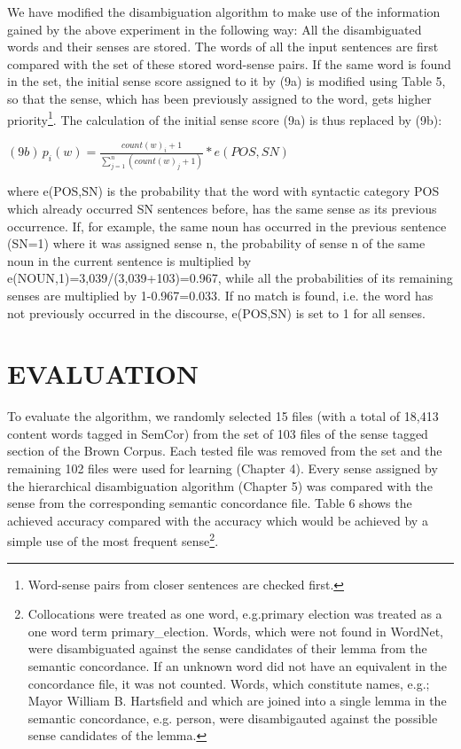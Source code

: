 We have modified the disambiguation algorithm to make use of the information gained by the above experiment in the following way: All the disambiguated words and their senses are stored. The words of all the input sentences are first compared with the set of these stored word-sense pairs. If the same word is found in the set, the initial sense score assigned to it by (9a) is modified using Table 5, so that the sense, which has been previously assigned to the word, gets higher priority\footnote{
Word-sense pairs from closer sentences are checked first.
}. The calculation of the initial sense score (9a) is thus replaced by (9b):
\begin{center}
$(9b) \, \displaystyle p_{i}(w) = \frac{\displaystyle count(w)_{i}+1}{\displaystyle \sum_{j=1}^{n}(count(w)_{j}+1)} * e(POS,SN) $
\end{center}
where e(POS,SN) is the probability that the word with syntactic category POS which already occurred SN sentences before, has the same sense as its previous occurrence. If, for example, the same noun has occurred in the previous sentence (SN=1) where it was assigned sense n, the probability of sense n of the same noun in the current sentence is multiplied by e(NOUN,1)=3,039/(3,039+103)=0.967, while all the probabilities of its remaining senses are multiplied by 1-0.967=0.033. If no match is found, i.e. the word has not previously occurred in the discourse, e(POS,SN) is set to 1 for all senses.

\section{EVALUATION}
To evaluate the algorithm, we randomly selected 15 files (with a total of 18,413 content words tagged in SemCor) from the set of 103 files of the sense tagged section of the Brown Corpus. Each tested file was removed from the set and the remaining 102 files were used for learning (Chapter 4). Every sense assigned by the hierarchical disambiguation algorithm (Chapter 5) was compared with the sense from the corresponding semantic concordance file. Table 6 shows the achieved accuracy compared with the accuracy which would be achieved by a simple use of the most frequent sense\footnote{
Collocations were treated as one word, e.g.primary election was treated as a one word term primary\_election. Words, which were not found in WordNet, were disambiguated against the sense candidates of their lemma from the semantic concordance. If an unknown word did not have an equivalent in the concordance file, it was not counted. Words, which constitute names, e.g.; Mayor William B. Hartsfield and which are joined into a single lemma in the semantic concordance, e.g. person, were disambigauted against the possible sense candidates of the lemma.
}.

